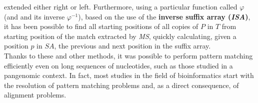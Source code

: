 \documentclass[a4paper,11pt, oneside]{article}
\begin{document}
extended either right or left. Furthermore, using a particular
function called $\varphi$ (and and its inverse $\varphi^{-1}$), based on the use
of the \textbf{inverse suffix array (\textit{ISA})}, it has been possible to
find all starting positions of all copies of $P$ in $T$ from starting position
of the match extracted by \textit{MS}, quickly calculating, given a position $p$
in $SA$, the previous and next position in the suffix array. \\
Thanks to these and other methods, it was possible to perform pattern matching
efficiently even on long sequences of nucleotides, such as those studied in
a pangenomic context. In fact, most studies in the field of bioinformatics start
with the resolution of pattern matching problems and, as a direct consequence,
of alignment problems. 
\end{document}
